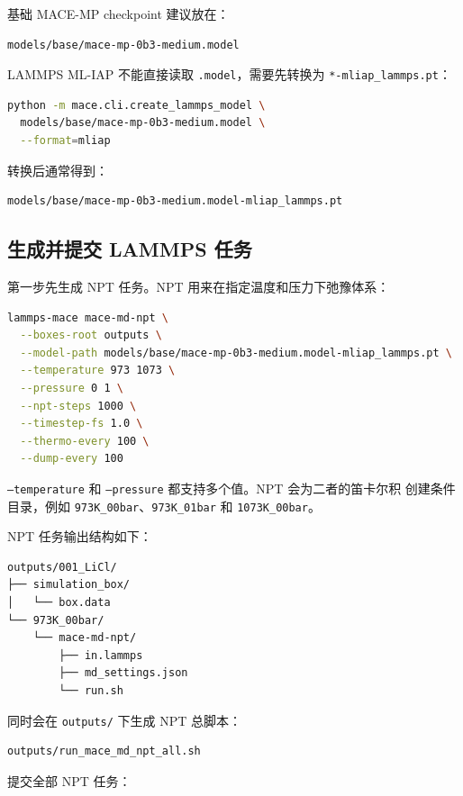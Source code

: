 \documentclass[11pt,a4paper]{article}
\begin{document}
基础 MACE-MP checkpoint 建议放在：

\begin{lstlisting}
models/base/mace-mp-0b3-medium.model
\end{lstlisting}

LAMMPS ML-IAP 不能直接读取 \texttt{.model}，需要先转换为 \texttt{*-mliap\_lammps.pt}：

\begin{lstlisting}[language=bash]
python -m mace.cli.create_lammps_model \
  models/base/mace-mp-0b3-medium.model \
  --format=mliap
\end{lstlisting}

转换后通常得到：

\begin{lstlisting}
models/base/mace-mp-0b3-medium.model-mliap_lammps.pt
\end{lstlisting}

\subsection{生成并提交 LAMMPS 任务}

第一步先生成 NPT 任务。NPT 用来在指定温度和压力下弛豫体系：

\begin{lstlisting}[language=bash]
lammps-mace mace-md-npt \
  --boxes-root outputs \
  --model-path models/base/mace-mp-0b3-medium.model-mliap_lammps.pt \
  --temperature 973 1073 \
  --pressure 0 1 \
  --npt-steps 1000 \
  --timestep-fs 1.0 \
  --thermo-every 100 \
  --dump-every 100
\end{lstlisting}

\texttt{--temperature} 和 \texttt{--pressure} 都支持多个值。NPT 会为二者的笛卡尔积
创建条件目录，例如 \texttt{973K\_00bar}、\texttt{973K\_01bar} 和 \texttt{1073K\_00bar}。

NPT 任务输出结构如下：

\begin{lstlisting}
outputs/001_LiCl/
├── simulation_box/
│   └── box.data
└── 973K_00bar/
    └── mace-md-npt/
        ├── in.lammps
        ├── md_settings.json
        └── run.sh
\end{lstlisting}

同时会在 \texttt{outputs/} 下生成 NPT 总脚本：

\begin{lstlisting}
outputs/run_mace_md_npt_all.sh
\end{lstlisting}

提交全部 NPT 任务：
\end{document}
